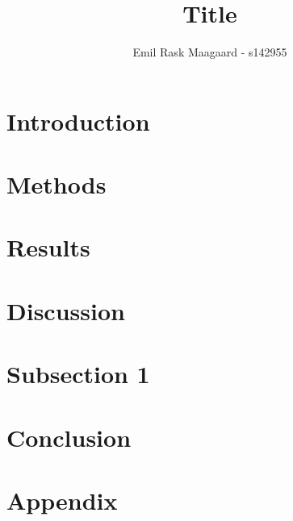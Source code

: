 \documentclass{dtu_report_columns}
\title{Title}
\author{Emil Rask Maagaard - s142955}
\begin{document}
\maketitle{}




\section{Introduction}


\section{Methods}


\section{Results}


\section{Discussion}


\section{Subsection 1}


\section{Conclusion}



\clearpage
\onecolumn
\section{Appendix}

\end{document}
